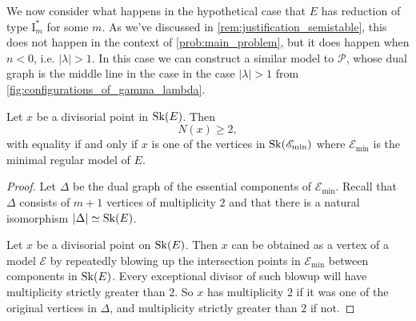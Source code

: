 We now consider what happens in the hypothetical case that $E$ has reduction of type $\mathrm I_m^*$ for some $m$. 
As we've discussed in \cref{rem:justification_semistable}, this does not happen in the context of \cref{prob:main_problem}, but it does happen when $n < 0$, i.e. $|\lambda| > 1$.  
In this case we can construct a similar model to $\mathscr P$, whose dual graph is the middle line in the case in the case $|\lambda| > 1$ from \cref{fig:configurations_of_gamma_lambda}. 


\begin{lemma}\label{lem:divisorial_points_Is}
	Let $x$ be a divisorial point in $\operatorname{Sk}(E)$. 
	Then  \[
		N(x) \ge 2
	,\] 
	with equality if and only if $x$ is one of the vertices in $\operatorname{Sk}(\mathscr E_\text{min} )$ where $\mathscr E_\text{min} $ is the minimal regular model of $E$. 
\end{lemma}
\begin{proof}
	Let $\Delta$ be the dual graph of the essential components of $\mathscr E_\text{min} $. 
	Recall that $\Delta$ consists of $m + 1$ vertices of multiplicity $2$ and that there is a natural isomorphism $ |\Delta| \simeq \operatorname{Sk}(E)$. 

	Let $x$ be a divisorial point on $\operatorname{Sk}(E)$.
	Then $x$ can be obtained as a vertex of a model $\mathscr E$ by repeatedly blowing up the intersection points in $\mathscr E_\text{min} $ between components in $\operatorname{Sk}(E)$. 
	Every exceptional divisor of such blowup will have multiplicity strictly greater than $2$. 
	So $x$ has multiplicity $2$ if it was one of the original vertices in $\Delta$, and multiplicity strictly greater than $2$ if not. 
\end{proof}

